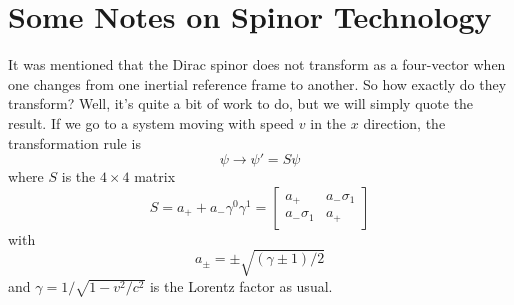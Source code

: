 \section{Some Notes on Spinor Technology}

It was mentioned that the Dirac spinor does not transform as a four-vector when
one changes from one inertial reference frame to another. So how exactly do they
transform? Well, it's quite a bit of work to do, but we will simply quote the
result. If we go to a system moving with speed $v$ in the $x$ direction, the
transformation rule is
\begin{equation}
\psi\to\psi' = S\psi
\end{equation}
where $S$ is the $4\times 4$ matrix
\begin{equation}
S = a_+ + a_- \gamma^0\gamma^1 = \begin{bmatrix} a_+ & a_-\sigma_1 \\
a_-\sigma_1 & a_+\end{bmatrix}
\end{equation}
with
\begin{equation}
a_{\pm} = \pm\sqrt{(\gamma\pm 1)/2}
\end{equation}
and $\gamma = 1/\sqrt{1-v^2/c^2}$ is the Lorentz factor as usual.

